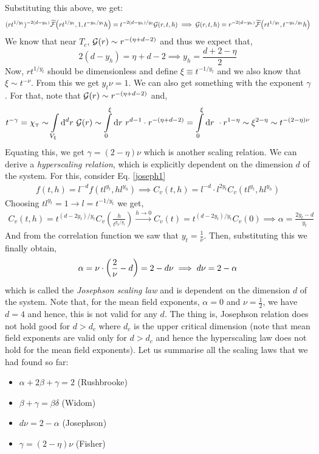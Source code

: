 Substituting this above, we get:
\begin{equation}
     (rt^{1/y_t})^{-2(d-y_h)} \widetilde{\mathcal F}\qty(rt^{1/y_t},1, t^{-y_h/y_t}h) = t^{-2(d-y_h)/y_t}\mathcal G(r,t,h)   \implies \mathcal G(r,t,h) = r^{-2(d-y_h)}\widetilde{\mathcal F}\qty(rt^{1/y_t},t^{-y_h/y_t}h)
\end{equation}
We know that near $T_c$, $\mathcal G(r)\sim r^{-(\eta+d-2)}$ and thus we expect that, $$2(d-y_h) = \eta+d-2 \implies y_h = \frac{d+2-\eta}{2}$$
Now, $rt^{1/y_t} $ should be dimensionless and define $\xi \equiv t^{-1/y_t}$ and we also know that $\xi \sim t^{-\nu}$. From this we get $ y_t\nu=1$. We can also get something with the exponent $\gamma$. For that, note that $\mathcal G(r)\sim r^{-(\eta+d-2)}$ and, 
\begin{align*}
   t^{-\gamma}= \chi_{\text{\tiny T}} \sim \int\limits_{V_\xi}\dd^d r \  \mathcal G({r}) \sim \int\limits_0^\xi \dd r\  r^{d-1} \cdot r^{-(\eta+d-2)} = \int\limits_0^\xi \dd r\   \cdot r^{1-\eta} \sim \xi^{2-\eta}  \sim t^{-(2-\eta)\nu}
\end{align*}
Equating this, we get $\gamma=(2-\eta)\nu$ which is another scaling relation. We can derive a \textit{hyperscaling relation}, which is explicitly dependent on the dimension $d$ of the system. For this, consider Eq. \eqref{joseph1}
\begin{align*}
   f(t,h) = l^{-d} f(tl^{y_t},hl^{y_h}) \implies C_v(t,h) = l^{-d}\cdot l^{2y_t}C_v(tl^{y_t},hl^{y_h})
\end{align*}
Choosing $tl^{y_t}=1 \rightarrow l = t^{-1/y_t}$ we get,
\begin{align*}
    C_v(t,h) = t^{(d-2y_t)/y_t} C_v(\frac{h}{t^{y_h/y_t}}) \xrightarrow{h\to 0} C_v(t) = t^{(d-2y_t)/y_t} C_v(0) \implies \alpha = \frac{2y_t-d}{y_t}
\end{align*}
And from the correlation function we saw that $y_t=\frac{1}{\nu}$. Then, substituting this we finally obtain,
\begin{align*}
    \alpha =\nu \cdot \qty(\frac{2}{\nu}-d) = 2-d\nu \implies d\nu = 2-\alpha
\end{align*}
which is called the \textit{Josephson scaling law} and is dependent on the dimension $d$ of the system. Note that, for the mean field exponents, $\alpha=0$ and $\nu=\frac{1}{2}$, we have $d=4$ and hence, this is not valid for any $d$. The thing is, Josephson relation does not hold good for $d>d_c$ where $d_c$ is the upper critical dimension (note that mean field exponents are valid only for $d>d_c$ and hence the hyperscaling law does not hold for the mean field exponents). Let us summarise all the scaling laws that we had found so far:
\begin{itemize}
    \item $\alpha +2\beta+\gamma =2 $ (Rushbrooke) 
    \item $\beta + \gamma = \beta \delta  $ (Widom)
    \item $d\nu = 2-\alpha$ (Josephson)
    \item $\gamma = (2-\eta)\nu$ (Fisher)
\end{itemize}
